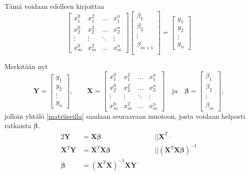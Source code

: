 \documentclass[12pt,a4paper,titlepage]{article}
\newcommand{\matr}[1]{\bm{#1}}
\newcommand{\transpose}[1]{{#1}^T}
\begin{document}
Tämä voidaan edelleen kirjoittaa~\cite{wolframmath}
\begin{equation} \label{matriiseilla}
	\begin{bmatrix}
		x_{1}^0 & x_{1}^2 & ...    & x_{1}^n \\
		x_{2}^0 & x_{2}^2 & ...    & x_{2}^n \\
		\vdots  & \vdots  & \ddots & \vdots  \\
		x_{m}^0 & x_{m}^2 &    ... & x_{m}^n
	\end{bmatrix}
	\begin{bmatrix}
		\beta_1 \\
		\beta_2 \\
		\vdots \\
		\beta_{m+1} \\
	\end{bmatrix}
	=
	\begin{bmatrix}
		y_1 \\
		y_2 \\
		\vdots \\
		y_n
	\end{bmatrix}
\end{equation}

Merkitään nyt
\begin{equation*}
	\matr{Y} =
		\begin{bmatrix}
			y_1 \\
			y_2 \\
			\vdots \\
			y_n
		\end{bmatrix},\qquad
	\matr{X} = 
		\begin{bmatrix}
			x_{1}^0 & x_{1}^2 & ...    & x_{1}^n \\
			x_{2}^0 & x_{2}^2 & ...    & x_{2}^n \\
			\vdots  & \vdots  & \ddots & \vdots  \\
			x_{m}^0 & x_{m}^2 &    ... & x_{m}^n
		\end{bmatrix} \quad \text{ja} \quad
	\matr{\beta} =
		\begin{bmatrix}
			\beta_1 \\
			\beta_2 \\
			\vdots \\
			\beta_m			
		\end{bmatrix},
\end{equation*}
jolloin yhtälö \ref{matriiseilla} saadaan seuraavaan muotoon, josta voidaan helposti ratkaista $\matr{\beta}$.~\cite{wolframmath}
\begin{alignat*}{2}
	\matr{Y} &= \matr{X}\matr{\beta} &&|| \transpose{\matr{X}} \cdot \\
	\transpose{\matr{X}}\matr{Y} &= \transpose{\matr{X}}\matr{X}\matr{\beta} &&|| (\transpose{\matr{X}}\matr{X}\matr{\beta})^{-1} \\
	\matr{\beta} &= (\transpose{\matr{X}}\matr{X})^{-1}\matr{X}\matr{Y} \quad &&
\end{alignat*}
\end{document}
